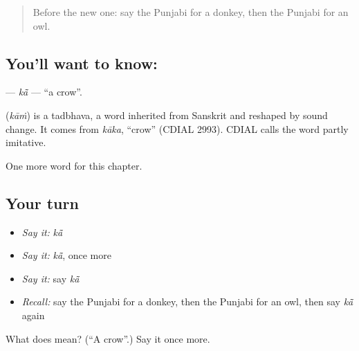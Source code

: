 \label{lesson:PA-C133-ka}



\begin{quote}
Before the new one: say the Punjabi for a donkey, then the Punjabi for an owl.
\end{quote}

\subsection*{You'll want to know: }
\textbf{} — \emph{kā̃} — \textquotedblleft{}a crow\textquotedblright{}.

\begin{cousinweb}
\textbf{} (\emph{kāṁ}) is a tadbhava, a word inherited from Sanskrit and reshaped by sound change. It comes from \emph{kāka}, \textquotedblleft{}crow\textquotedblright{} (CDIAL 2993). CDIAL calls the word partly imitative.
\end{cousinweb}

\begin{grammarlens}[title={What you've built}]
One more word for this chapter.
\end{grammarlens}

\subsection*{Your turn}
\begin{itemize}
\raggedright
  \item \emph{Say it:} \emph{kā̃}
  \item \emph{Say it:} \emph{kā̃}, once more
  \item \emph{Say it:} say \emph{kā̃}
  \item \emph{Recall:} say the Punjabi for a donkey, then the Punjabi for an owl, then say \emph{kā̃} again
\end{itemize}

\begin{tcolorbox}[breakable,colback=teal!4,colframe=teal!35!black,title={Before you move on}]
What does  mean? (\textquotedblleft{}A crow\textquotedblright{}.) Say it once more.
\end{tcolorbox}
